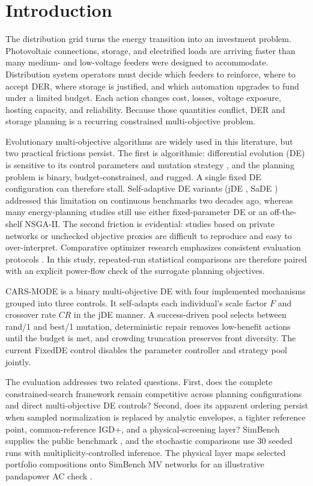 \documentclass[energies,article,submit,moreauthors]{Definitions/mdpi}
\begin{document}
\section{Introduction}\label{introduction}

The distribution grid turns the energy transition into an investment problem. Photovoltaic connections, storage, and electrified loads are arriving faster than many medium- and low-voltage feeders were designed to accommodate. Distribution system operators must decide which feeders to reinforce, where to accept DER, where storage is justified, and which automation upgrades to fund under a limited budget. Each action changes cost, losses, voltage exposure, hosting capacity, and reliability. Because those quantities conflict, DER and storage planning is a recurring constrained multi-objective problem.

Evolutionary multi-objective algorithms are widely used in this literature, but two practical frictions persist. The first is algorithmic: differential evolution (DE) is sensitive to its control parameters and mutation strategy \cite{ref1}, and the planning problem is binary, budget-constrained, and rugged. A single fixed DE configuration can therefore stall. Self-adaptive DE variants (jDE \cite{ref2}, SaDE \cite{ref3}) addressed this limitation on continuous benchmarks two decades ago, whereas many energy-planning studies still use either fixed-parameter DE or an off-the-shelf NSGA-II. The second friction is evidential: studies based on private networks or unchecked objective proxies are difficult to reproduce and easy to over-interpret. Comparative optimizer research emphasizes consistent evaluation protocols \cite{ref4}. In this study, repeated-run statistical comparisons are therefore paired with an explicit power-flow check of the surrogate planning objectives.

CARS-MODE is a binary multi-objective DE with four implemented mechanisms grouped into three controls. It self-adapts each individual's scale factor \(F\) and crossover rate \(CR\) in the jDE manner. A success-driven pool selects between rand/1 and best/1 mutation, deterministic repair removes low-benefit actions until the budget is met, and crowding truncation preserves front diversity. The current FixedDE control disables the parameter controller and strategy pool jointly.

The evaluation addresses two related questions. First, does the complete constrained-search framework remain competitive across planning configurations and direct multi-objective DE controls? Second, does its apparent ordering persist when sampled normalization is replaced by analytic envelopes, a tighter reference point, common-reference IGD+, and a physical-screening layer? SimBench supplies the public benchmark \cite{ref5}, and the stochastic comparisons use 30 seeded runs with multiplicity-controlled inference. The physical layer maps selected portfolio compositions onto SimBench MV networks for an illustrative pandapower AC check \cite{ref7}.
\end{document}
